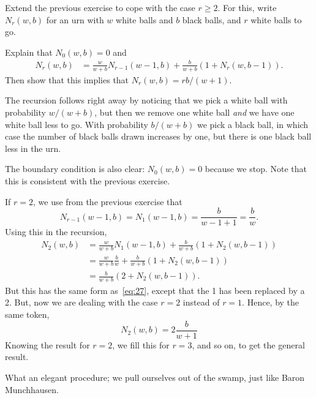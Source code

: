 \documentclass[lectures]{subfiles}
\begin{document}
\begin{exercise}
Extend the previous exercise to cope with the case $r\geq 2$.
For this, write $N_{r}(w,b)$ for an urn with $w$ white balls and $b$ black balls, and $r$ white balls to go.
\begin{hint}
Explain that $N_{0}(w,b) = 0$ and
\begin{align}
  N_r(w,b) &= \frac{w}{w+b} N_{r-1}(w-1, b) +  \frac{b}{w+b} (1+N_{r}(w, b-1)).
\end{align}
Then show that this implies that $N_{r}(w,b) = r b/ (w+1)$.
\end{hint}
\begin{solution}
The recursion follows right away by noticing that we pick a white ball with probability $w/(w+b)$, but then we remove one white ball \emph{and} we have one white ball less to go.
With probability $b/(w+b)$ we pick a black ball, in which case the number of black balls drawn increases by one, but there is one black ball less in the urn.

The boundary condition is also clear: $N_{0}(w,b)=0$ because we stop.
Note that this is consistent with the previous exercise.

If $r=2$, we use from the previous exercise that
\begin{equation*}
N_{r-1}(w-1, b) = N_{1}(w-1, b) = \frac{b }{w-1 + 1} = \frac{b }{w}.
\end{equation*}
Using this in the recursion,
\begin{align*}
  N_2(w,b)
&= \frac{w}{w+b} N_{1}(w-1, b) +  \frac{b}{w+b} (1+N_{2}(w, b-1)) \\
&= \frac{w}{w+b} \frac{b }{w} +  \frac{b}{w+b} (1+N_{2}(w, b-1)) \\
&=  \frac{b}{w+b} (2+N_{2}(w, b-1)).
\end{align*}
But this has the same form as~\cref{eq:27}, except that the 1 has been replaced by a 2. But, now we are dealing with the case $r=2$ instead of $r=1$. Hence, by the same token,
\begin{equation*}
  N_2(w,b) = 2 \frac{b}{w+1}
\end{equation*}
Knowing the result for $r=2$, we fill this for $r=3$, and so on, to get the general result.

What an elegant procedure;  we pull ourselves out of the swamp, just like Baron Munchhausen.
\end{solution}
\end{exercise}
\end{document}
